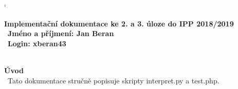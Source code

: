 \documentclass[a4paper, 11pt]{article}
\begin{document}
\catcode` %
\pagestyle{fancy}
\fancyhf{}

\setlength{\parindent}{0mm}
\large{\textbf{Implementační dokumentace ke 2. a 3. úloze do IPP 2018/2019}}\\\
\large{\textbf{Jméno a příjmení: Jan Beran}}\\\
\large{\textbf{Login: xberan43}}\\\

\large{\textbf{Úvod}}\\\
Tato dokumentace stručně popisuje skripty interpret.py a test.php.\\
\end{document}
